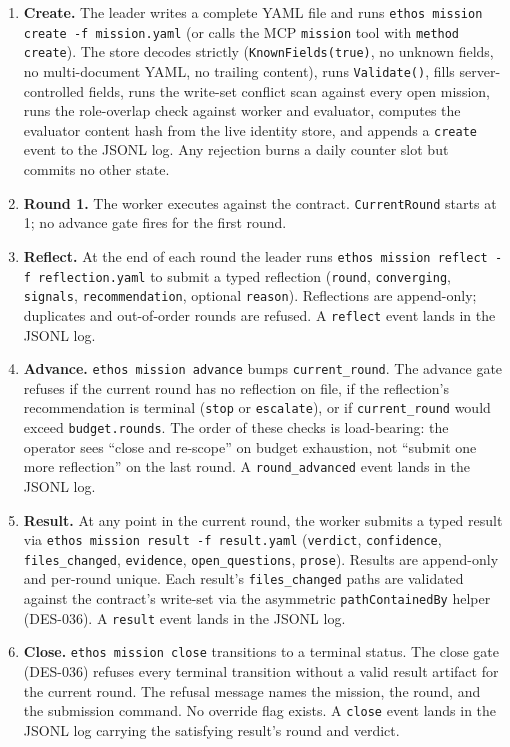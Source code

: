 \documentclass[a4paper,10pt]{article}
\newcommand{\tool}[1]{\texttt{#1}}
\newcommand{\field}[1]{\texttt{#1}}
\newcommand{\cmd}[1]{\texttt{#1}}
\begin{document}
\begin{enumerate}
  \item \textbf{Create.}  The leader writes a complete YAML file
    and runs \cmd{ethos mission create -f mission.yaml} (or calls
    the MCP \tool{mission} tool with \field{method} \texttt{create}).
    The store decodes strictly (\texttt{KnownFields(true)}, no
    unknown fields, no multi-document YAML, no trailing content),
    runs \texttt{Validate()}, fills server-controlled fields, runs
    the write-set conflict scan against every open mission, runs
    the role-overlap check against worker and evaluator, computes
    the evaluator content hash from the live identity store, and
    appends a \texttt{create} event to the JSONL log.  Any
    rejection burns a daily counter slot but commits no other
    state.
  \item \textbf{Round 1.}  The worker executes against the contract.
    \texttt{CurrentRound} starts at 1; no advance gate fires for
    the first round.
  \item \textbf{Reflect.}  At the end of each round the leader runs
    \cmd{ethos mission reflect -f reflection.yaml} to submit a
    typed reflection (\field{round}, \field{converging},
    \field{signals}, \field{recommendation},
    optional \field{reason}).  Reflections are append-only;
    duplicates and out-of-order rounds are refused.  A
    \texttt{reflect} event lands in the JSONL log.
  \item \textbf{Advance.}  \cmd{ethos mission advance} bumps
    \field{current\_round}.  The advance gate refuses if the
    current round has no reflection on file, if the reflection's
    recommendation is terminal (\texttt{stop} or \texttt{escalate}),
    or if \field{current\_round} would exceed \field{budget.rounds}.
    The order of these checks is load-bearing: the operator sees
    ``close and re-scope'' on budget exhaustion, not ``submit one
    more reflection'' on the last round.  A
    \texttt{round\_advanced} event lands in the JSONL log.
  \item \textbf{Result.}  At any point in the current round, the
    worker submits a typed result via \cmd{ethos mission result -f
    result.yaml} (\field{verdict}, \field{confidence},
    \field{files\_changed}, \field{evidence},
    \field{open\_questions}, \field{prose}).  Results are
    append-only and per-round unique.  Each result's
    \field{files\_changed} paths are validated against the
    contract's write-set via the asymmetric
    \texttt{pathContainedBy} helper (DES-036).  A \texttt{result}
    event lands in the JSONL log.
  \item \textbf{Close.}  \cmd{ethos mission close} transitions to
    a terminal status.  The close gate (DES-036) refuses every
    terminal transition without a valid result artifact for the
    current round.  The refusal message names the mission, the
    round, and the submission command.  No override flag exists.
    A \texttt{close} event lands in the JSONL log carrying the
    satisfying result's round and verdict.
\end{enumerate}
\end{document}
